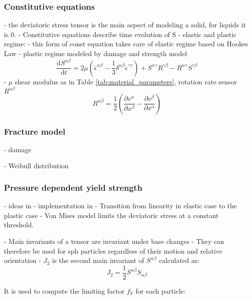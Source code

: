 \subsubsection{Constitutive equations}
- the deviatoric stress tensor is the main aspect of modeling a solid, for liquids it is 0.
- Constitutive equations describe time evolution of S
- elastic and plastic regime:
- this form of const equation takes care of elastic regime based on Hookes Law
- plastic regime modeled by damage and strength model
\begin{equation}
    \frac{\mathrm {d}S^{\alpha \beta} }{\mathrm {d}t}  = 2\mu (\dot{\epsilon}^{\alpha \beta} - \frac{1}{3}\delta^{\alpha \beta}\dot{\epsilon}^{\gamma \gamma}) + S^{\alpha \gamma}R^{\gamma \beta} - R^{\alpha \gamma}S^{\gamma \beta}
\end{equation}
- $\mu$ shear modulus as in Table \ref{tab:material_parameters}, rotation rate sensor $R^{\alpha \beta}$
\begin{equation}
    R^{\alpha \beta} = \frac{1}{2} (\frac{\partial v^{\alpha} }{\partial x^\beta} - \frac{\partial v^{\beta} }{\partial x^\alpha})
\end{equation}

\subsubsection{Fracture model} \label{sect:fracture_model}

- damage

- Weibull distribution

\subsubsection{Pressure dependent yield strength}
- ideas in \cite{Collins_2004}
- implementation in \cite{Jutzi_2015}
- Transition from linearity in elastic case to the plastic case
- Von Mises model limits the deviatoric stress at a constant threshold.

- Main invariants of a tensor are invariant under base changes
- They can therefore be used for sph particles regardless of their motion and relative orientation
- $J_2$ is the second main invariant of $S^{\alpha \beta}$ calculated as:
\begin{equation}
    J_2 = \frac{1}{2}S^{\alpha \beta}S_{\alpha \beta}
\end{equation}

It is used to compute the limiting factor $f_Y$ for each particle:

